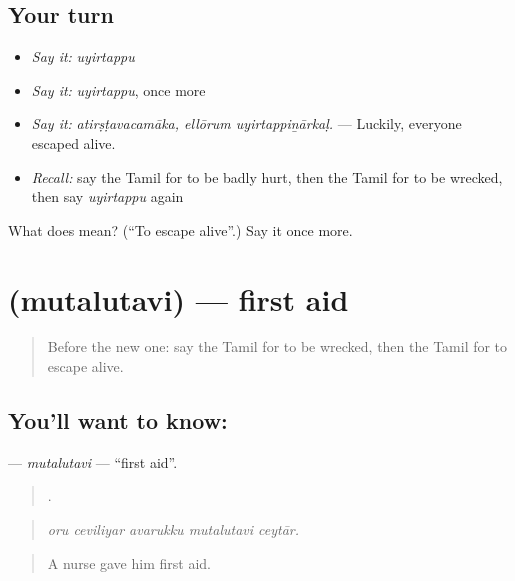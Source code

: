 \subsection*{Your turn}
\begin{itemize}
\raggedright
  \item \emph{Say it:} \emph{uyirtappu}
  \item \emph{Say it:} \emph{uyirtappu}, once more
  \item \emph{Say it:} \emph{atirṣṭavacamāka, ellōrum uyirtappiṉārkaḷ.} — Luckily, everyone escaped alive.
  \item \emph{Recall:} say the Tamil for to be badly hurt, then the Tamil for to be wrecked, then say \emph{uyirtappu} again
\end{itemize}

\begin{tcolorbox}[breakable,colback=teal!4,colframe=teal!35!black,title={Before you move on}]
What does  mean? (\textquotedblleft{}To escape alive\textquotedblright{}.) Say it once more.
\end{tcolorbox}
\section[\texorpdfstring{\ta{முதலுதவி} (mutalutavi)}{முதலுதவி (mutalutavi)}]{ (mutalutavi) — first aid}

\label{lesson:TA-C298-mutalutavi}



\begin{quote}
Before the new one: say the Tamil for to be wrecked, then the Tamil for to escape alive.
\end{quote}

\subsection*{You'll want to know: }
\textbf{} — \emph{mutalutavi} — \textquotedblleft{}first aid\textquotedblright{}.

\begin{quote}
    .
\end{quote}

\begin{quote}
\emph{oru ceviliyar avarukku mutalutavi ceytār.}
\end{quote}

\begin{quote}
A nurse gave him first aid.
\end{quote}

